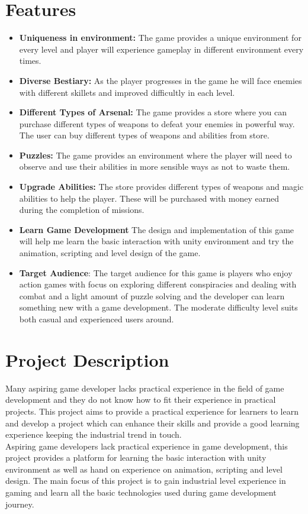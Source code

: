 \section{Features}
\begin{itemize}
	\item \textbf{Uniqueness in environment:} The game provides a unique environment for every level and player will experience gameplay in different environment every times.
	
	\item \textbf{Diverse Bestiary:} As the player progresses in the game he will face enemies with different skillets and improved difficultly in each level.
	
	\item \textbf{Different Types of Arsenal:} The game provides a store where you can purchase different types of weapons to defeat your enemies in powerful way. The user can buy different types of weapons and abilities from store.
	
	\item \textbf{Puzzles:} The game provides an environment where the player will need to observe and use their abilities in more sensible ways as not to waste them.
	
	\item \textbf{Upgrade Abilities:} The store provides different types of weapons and magic abilities to help the player. These will be purchased with money earned during the completion of missions.
	
	\item \textbf{Learn Game Development} The design and implementation of this game will help me learn the basic interaction with unity environment and try the animation, scripting and level design of the game.
	\item \textbf{Target Audience}: The target audience for this game is players who enjoy action games with focus on exploring different conspiracies and dealing with combat and a light amount of puzzle solving and the developer can learn something new with a game development. The moderate difficulty level suits both casual and experienced users around.
\end{itemize}

\section{Project Description}
Many aspiring game developer lacks practical experience in the field of game development and they do not know how to fit their experience in practical projects. This project aims to provide a practical experience for learners to learn and develop a project which can enhance their skills and provide a good learning experience keeping the industrial trend in touch.
\\
Aspiring game developers lack practical experience in game development, this project provides a platform for learning the basic interaction with unity environment as well as hand on experience on animation, scripting and level design.
The main focus of this project is to gain industrial level experience in gaming and learn all the basic technologies used during game development journey.


